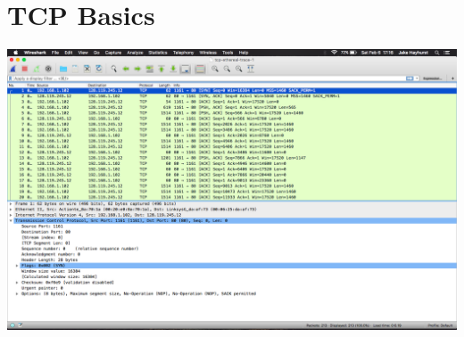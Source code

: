 \documentclass{article}
\begin{document}
\section {TCP Basics}
\includegraphics[width=\textwidth]{part3SYN}\\\\
\end{document}
